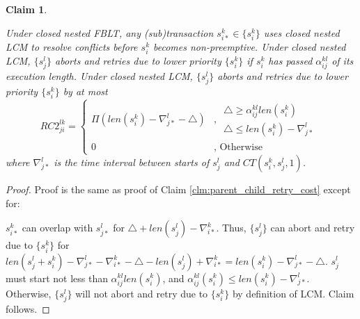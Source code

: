 \documentclass[10pt, conference, compsocconf]{IEEEtran}
\newtheorem{clm}{Claim}
\begin{document}
\begin{clm}\label{clm:closed_nested_lcm_after_alpha}

Under closed nested FBLT, any (sub)transaction $s_{i*}^{k}\in\{s_{i}^{k}\}$
uses closed nested LCM to resolve conflicts before $s_{i}^{k}$ becomes
non-preemptive. Under closed nested LCM, $\{s_{j}^{l}\}$ aborts and
retries due to lower priority $\{s_{i}^{k}\}$ if $s_{i}^{k}$ has
passed $\alpha_{ij}^{kl}$ of its execution length. Under closed nested
LCM, $\{s_{j}^{l}\}$ aborts and retries due to lower priority $\{s_{i}^{k}\}$
by at most 
\begin{equation}
RC2_{ji}^{lk}=\begin{cases}
\Pi\left(len\left(s_{i}^{k}\right)-\nabla_{j*}^{l}-\triangle\right) & ,\,\begin{gathered}\triangle\ge\alpha_{ij}^{kl}len\left(s_{i}^{k}\right)\\
\triangle\le len\left(s_{i}^{k}\right)-\nabla_{j*}^{l}
\end{gathered}
\\
0 & ,\mbox{ Otherwise}
\end{cases}\label{eq:closed_nested_lcm_after_alpha_two_tx}
\end{equation}
 where $\nabla_{j*}^{l}$ is the time interval between starts of $s_{j}^{l}$
and $CT(s_{i}^{k},s_{j}^{l},1)$.

\end{clm}

\begin{proof}

Proof is the same as proof of Claim \ref{clm:parent_child_retry_cost}
except for:

$s_{i*}^{k}$ can overlap with $s_{j*}^{l}$ for $\triangle+len\left(s_{j}^{l}\right)-\nabla_{i*}^{k}$.
Thus, $\{s_{j}^{l}\}$ can abort and retry due to $\{s_{i}^{k}\}$
for $len\left(s_{j}^{l}+s_{i}^{k}\right)-\nabla_{j*}^{l}-\nabla_{i*}^{k}-\triangle-len\left(s_{j}^{l}\right)+\nabla_{i*}^{k}=len\left(s_{i}^{k}\right)-\nabla_{j*}^{l}-\triangle$.
$s_{j}^{l}$ must start not less than $\alpha_{ij}^{kl}len\left(s_{i}^{k}\right)$,
and $\alpha_{ij}^{kl}\left(s_{i}^{k}\right)\le len\left(s_{i}^{k}\right)-\nabla_{j*}^{l}$.
Otherwise, $\{s_{j}^{l}\}$ will not abort and retry due to $\{s_{i}^{k}\}$
by definition of LCM. Claim follows.

\end{proof}
\end{document}
